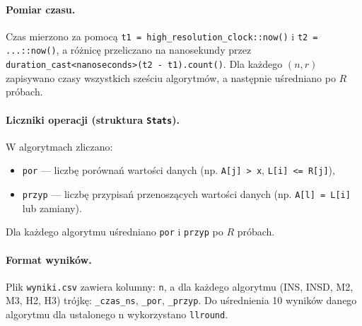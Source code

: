 \documentclass{article}
\begin{document}
	
	\paragraph{Pomiar czasu.}
	Czas mierzono za pomocą \texttt{t1 = high\_resolution\_clock::now()} i \texttt{t2 = ...::now()}, a różnicę przeliczano na nanosekundy przez
	\texttt{duration\_cast<nanoseconds>(t2 - t1).count()}. Dla każdego $(n,r)$ zapisywano czasy wszystkich sześciu algorytmów, a następnie uśredniano po $R$ próbach.
	
	\paragraph{Liczniki operacji (struktura \texttt{Stats}).}
	W algorytmach zliczano:
	\begin{itemize}
		\item \texttt{por} — liczbę porównań wartości danych (np. \texttt{A[j] > x}, \texttt{L[i] \textless= R[j]}),
		\item \texttt{przyp} — liczbę przypisań przenoszących wartości danych (np. \texttt{A[l] = L[i]} lub zamiany).
	\end{itemize}
	Dla każdego algorytmu uśredniano \texttt{por} i \texttt{przyp} po $R$ próbach.
	
	\paragraph{Format wyników.}
	Plik \texttt{wyniki.csv} zawiera kolumny:
	\texttt{n}, a dla każdego algorytmu (INS, INSD, M2, M3, H2, H3) trójkę: \texttt{\_czas\_ns}, \texttt{\_por}, \texttt{\_przyp}.
	Do uśrednienia 10 wyników danego algorytmu dla ustalonego n wykorzystano \texttt{llround}.
	
\end{document}
